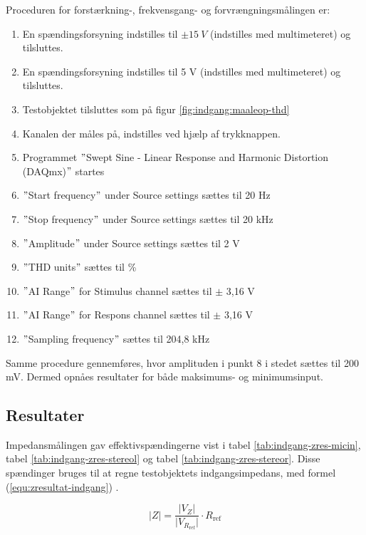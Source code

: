 Proceduren for forstærkning-, frekvensgang- og forvrængningsmålingen er:

\begin{enumerate}
\item En spændingsforsyning indstilles til $\pm15~V$ (indstilles med multimeteret) og tilsluttes.
\item En spændingsforsyning indstilles til 5 V (indstilles med multimeteret) og tilsluttes.
\item Testobjektet tilsluttes som på figur \ref{fig:indgang:maaleop-thd}
\item Kanalen der måles på, indstilles ved hjælp af trykknappen.
\item Programmet $"$Swept Sine - Linear Response and Harmonic Distortion (DAQmx)$"$ startes
\item $"$Start frequency$"$ under Source settings sættes til 20 Hz
\item $"$Stop frequency$"$ under Source settings sættes til 20 kHz
\item $"$Amplitude$"$ under Source settings sættes til 2 V
\item $"$THD units$"$ sættes til \%
\item $"$AI Range$"$ for Stimulus channel sættes til $\pm$ 3,16 V
\item $"$AI Range$"$ for Respons channel sættes til $\pm$ 3,16 V
\item $"$Sampling frequency$"$ sættes til 204,8 kHz
\end{enumerate}

Samme procedure gennemføres, hvor amplituden i punkt 8 i stedet sættes til 200 mV. Dermed opnåes resultater for både maksimums- og minimumsinput. 

\subsection*{Resultater}
\label{maalejournal_resultater}

Impedansmålingen gav effektivspændingerne vist i tabel \ref{tab:indgang-zres-micin}, tabel \ref{tab:indgang-zres-stereol} og tabel \ref{tab:indgang-zres-stereor}. Disse spændinger bruges til at regne testobjektets indgangsimpedans, med formel (\ref{equ:zresultat-indgang}) \cite{maaling-mm4}.%

\begin{equation}
\label{equ:zresultat-indgang}
\vert Z \vert = \frac{\vert V_Z \vert}{\vert V_{R_\mathrm{ref}} \vert} \cdot R_\mathrm{ref}
\end{equation} 

